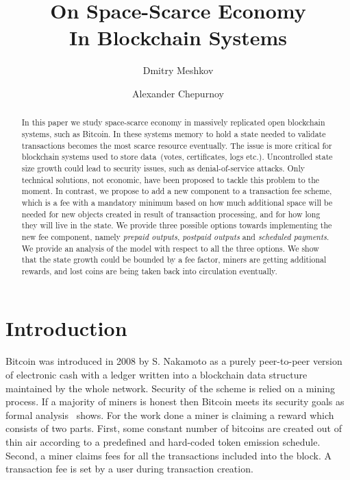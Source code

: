 \documentclass[]{llncs}   %
\begin{document}
\title{On Space-Scarce Economy\\ In Blockchain Systems}
\author{Dmitry Meshkov \and Alexander Chepurnoy}
\maketitle

\begin{abstract}
In this paper we study space-scarce economy in massively replicated open blockchain systems, such as Bitcoin. In these systems memory to hold a state needed to validate transactions becomes the most scarce resource eventually. The issue is more critical for blockchain systems used to store data~(votes, certificates, logs etc.). Uncontrolled state size growth could lead to security issues, such as denial-of-service attacks. Only technical solutions, not economic, have been proposed to tackle this problem to the moment. In contrast, we propose to add a new component to a transaction fee scheme, which is a fee with a mandatory minimum based on how much additional space will be needed for new objects created in result of transaction processing, and for how long they will live in the state. We provide three possible options towards implementing the new fee component, namely \textit{prepaid outputs}, \textit{postpaid outputs} and \textit{scheduled payments}. We provide an analysis of the model with respect to all the three options. We show that the state growth could be bounded by a fee factor, miners are getting additional rewards, and lost coins are being taken back into circulation eventually.    
\end{abstract}

\section{Introduction}

Bitcoin \cite{Nakamoto2008} was introduced in 2008 by S. Nakamoto as a purely peer-to-peer version of electronic cash with a ledger written into a blockchain data structure maintained by the whole network. Security of the scheme is relied on a mining process. If a majority of miners is honest then Bitcoin meets its security goals as formal analysis~\cite{Garay2015} shows. For the work done a miner is claiming a reward which consists of two parts. First, some constant number of bitcoins are created out of thin air according to a predefined and hard-coded token emission schedule. Second, a miner claims fees for all the transactions included into the block. A transaction fee is set by a user during transaction creation.
\end{document}
